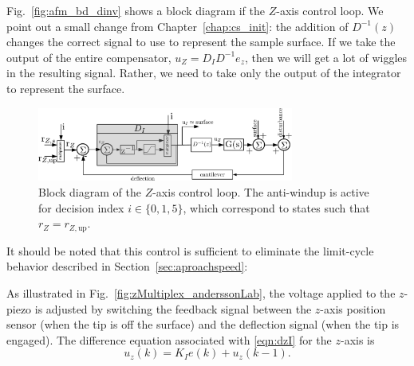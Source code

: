 \documentclass[twocolumn,twoside]{IEEEtran/IEEEtran}
\begin{document}
Fig.~\ref{fig:afm_bd_dinv} shows a block diagram if the $Z$-axis control loop.
We point out a small change from Chapter~\ref{chap:cs_init}: the addition of
$D^{-1}(z)$ changes the correct signal to use to represent the sample surface.
If we take the output of the entire compensator, $u_Z=D_ID^{-1}e_z$, then we
will get a lot of wiggles in the resulting signal. Rather, we need to take only
the output of the integrator to represent the surface.
\begin{figure}[t]
  \centering
  \includegraphics[width=0.75\textwidth]{figures/AFM_loop_Dinv_antiwup-crop.pdf}
  \caption{Block diagram of the $Z$-axis control loop. The anti-windup is active
    for decision index $i\in\{0,1,5\}$, which correspond to states such that
    $r_Z=r_{Z,\textrm{up}}$.}
  \label{fig:afm_bd_dinv_final}
\end{figure}


It should be noted that this control is sufficient to eliminate the limit-cycle
behavior described in Section~\ref{sec:aproachspeed}:

	
As illustrated in Fig.~\ref{fig:zMultiplex_anderssonLab}, the voltage applied to
the $z$-piezo is adjusted by switching the feedback signal between the $z$-axis
position sensor (when the tip is off the surface) and the deflection signal
(when the tip is engaged). The difference equation associated with
\eqref{eqn:dzI} for the $z$-axis is
\begin{equation}
  u_z(k) = K_Ie(k) + u_z(k-1).
  \label{eqn:intdiff}
\end{equation}
\end{document}
